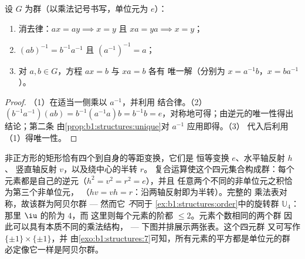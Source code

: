 \begin{proposition}[运算规则]\label{prop:b1:structures:rules}
设 $G$ 为群（以乘法记号书写，单位元为 $e$）：
\begin{enumerate}
  \item 消去律：$ax = ay \implies x = y$ 且 $xa = ya \implies
        x = y$；
  \item $(ab)^{-1} = b^{-1} a^{-1}$ 且 $(a^{-1})^{-1} = a$；
  \item 对 $a, b \in G$，方程 $ax = b$ 与 $xa = b$ 各有
        唯一解（分别为 $x = a^{-1}b$，$x = b a^{-1}$）。
\end{enumerate}
\end{proposition}

\begin{proof}
（1）在适当一侧乘以 $a^{-1}$，并利用
结合律。（2）$(b^{-1}a^{-1})(ab) = b^{-1}(a^{-1}a)b = b^{-1}b =
e$，对称地可得；由逆元的唯一性得出结论；第二条
由\cref{prop:b1:structures:unique}对 $a^{-1}$ 应用即得。（3）
代入后利用（1）得唯一性。
\end{proof}

\begin{example}[矩形的对称性]\label{ex:b1:structures:klein}
非正方形的矩形恰有四个到自身的等距变换，它们是
恒等变换 $e$、水平轴反射 $h$、
竖直轴反射 $v$，以及绕中心的半转 $r$。
复合运算使这个四元集合构成群：每个
元素都是自己的逆元（$h^2 = v^2 = r^2 = e$），并且
任意两个不同的非单位元之积恰为第三个非单位元，
（$hv = vh = r$：沿两轴反射即为半转）。完整的
乘法表对称，故该群为阿贝尔群 --- 然而它
\emph{不}同于 \cref{ex:b1:structures:order}中的旋转群 $\mathbb U_4$：
那里 $\iu$ 的阶为 $4$，而
这里则每个元素的阶都 $\leq 2$。元素个数相同的两个群
因此可以具有本质不同的乘法结构，
--- 下图并排展示两张表。这个四元群
又可写作 $\{\pm1\} \times \{\pm1\}$，并
由\cref{exo:b1:structures:7}可知，所有元素的平方都是单位元的群
必定像它一样是阿贝尔群。
\end{example}

